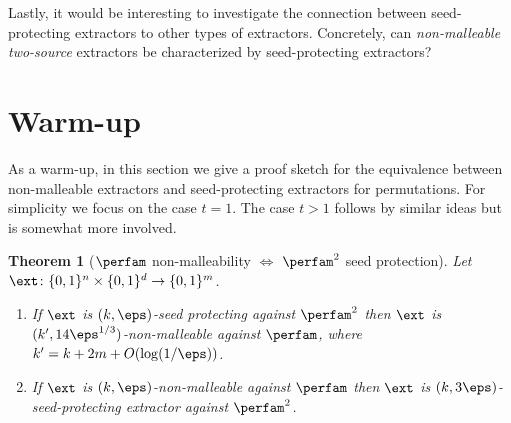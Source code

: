\documentclass[11pt]{article}
\numberwithin{equation}{section}
\newtheorem{theorem}{Theorem}[section]
\theoremstyle{definition}
\theoremstyle{plain}
\begin{document}
Lastly, it would be interesting to investigate the connection between seed-protecting extractors to other types of extractors. Concretely, can \emph{non-malleable two-source} extractors be characterized by seed-protecting extractors?

%



\section{Warm-up}\label{sec:overview}

As a warm-up, in this section we give a proof sketch for the equivalence between non-malleable extractors and seed-protecting extractors for permutations. For simplicity we focus on the case $t = 1$. The case $t > 1$ follows by similar ideas but is somewhat more involved. 

\begin{theorem}[$\perfam$ non-malleability $\iff$ $\perfam^2$ seed protection]\label{thm:warmup}
Let $\ext \colon \{0,1\}^n \times \{0,1\}^d \to \{0,1\}^m$.%
\begin{enumerate}
	\item If $\ext$ is $(k,\eps)$-seed protecting against $\perfam^2$ then $\ext$ is $(k',14\eps^{1/3})$-non-malleable against $\perfam$, where $k' = k+2m+O(\log(1/\eps))$.
	\item If $\ext$ is $(k,\eps)$-non-malleable against $\perfam$ then $\ext$ is $(k,3\eps)$-seed-protecting extractor against $\perfam^2$.
\end{enumerate}
\end{theorem}
\end{document}
